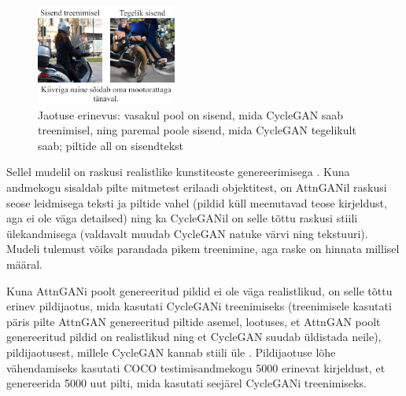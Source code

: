 \documentclass{vilgym}
\begin{document}
	\begin{figure}
		\includegraphics[width=0.41\textwidth]{images/distribution.png}
		\caption{Jaotuse erinevus: vasakul pool on sisend, mida CycleGAN saab treenimisel, ning paremal poole sisend, mida CycleGAN tegelikult saab; piltide all on sisendtekst}
		\label{fig:dist}
	\end{figure}
	Sellel mudelil on raskusi realistlike kunstiteoste genereerimisega . Kuna andmekogu sisaldab pilte mitmetest erilaadi objektitest, on AttnGANil raskusi seose leidmisega teksti ja 
	piltide vahel (pildid küll meenutavad teose kirjeldust, aga ei ole väga detailsed) ning ka CycleGANil on selle tõttu raskusi stiili ülekandmisega (valdavalt muudab CycleGAN natuke värvi ning tekstuuri). Mudeli tulemust võiks parandada pikem treenimine, aga raske on hinnata millisel määral.


	Kuna AttnGANi poolt genereeritud pildid ei ole väga realistlikud, on selle tõttu erinev pildijaotus, mida kasutati \mbox{CycleGANi} treenimiseks (treenimisele kasutati päris pilte AttnGAN genereeritud piltide asemel, lootuses, et AttnGAN poolt genereeritud pildid on realistlikud ning et CycleGAN suudab üldistada neile), pildijaotusest, millele CycleGAN kannab stiili üle . Pildijaotuse lõhe vähendamiseks kasutati COCO testimisandmekogu 5000 erinevat kirjeldust, et genereerida 5000 uut pilti, mida kasutati seejärel CycleGANi treenimiseks.
\end{document}
